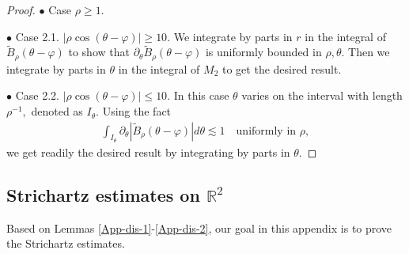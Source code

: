 \documentclass[11pt,reqno]{article}
\numberwithin{equation}{section}
\newcommand\R{{\mathbb R}}
\let\pa=\partial
\begin{document}
\begin{appendices}
\begin{proof}
	$\bullet$ Case $\rho\geq 1.$ 
	
	\quad $\bullet$ Case 2.1. $|\rho\cos(\theta-\varphi)|\geq 10.$ 
	We integrate by parts in $r$ in the integral of $\tilde{B}_{\rho}(\theta-\varphi)$ to show that $ \pa_{\theta} \tilde{B}_{\rho}(\theta-\varphi)$ is uniformly bounded in $\rho,\theta.$ Then we integrate by parts in $\theta$ in the integral of $M_2$ to get the desired result.
	
	
	\quad $\bullet$ Case 2.2. $|\rho\cos(\theta-\varphi)|\leq 10.$ In this case $\theta$ varies on the interval with length $\rho^{-1},$ denoted as $I_{\theta}.$ Using the fact 
	\begin{align*}
		\int_{I_{\theta}} \pa_{\theta} |\tilde{B}_{\rho}(\theta-\varphi)| d\theta \lesssim 1 \quad \text{uniformly in $\rho,$}
	\end{align*}
	we get readily the desired result by integrating by parts in $\theta.$\fi
	
\end{proof}




\subsection{Strichartz estimates on \texorpdfstring{$\R^2$}{R2}}
Based on Lemmas \ref{App-dis-1}-\ref{App-dis-2}, our goal in this appendix is to prove the Strichartz estimates.


\end{appendices}
\end{document}
